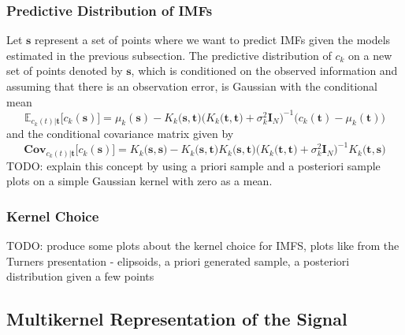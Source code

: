 \documentclass[article,moreauthors,pdftex,10pt,a4paper]{ssrn}
\begin{document}
\subsubsection{Predictive Distribution of IMFs}
Let $\mathbf{s}$ represent a set of points where we want to predict IMFs given the models estimated in the previous subsection.  The predictive distribution of $c_k$ on a new set of points denoted by $\mathbf{s}$, which is conditioned on the observed information and assuming that there is an observation error, is Gaussian with the conditional mean
\begin{equation*}
\mathbb{E}_{c_k(t)|\mathbf{t}} \big[c_k(\mathbf{s})] = \mu_k(\mathbf{s}) -  K_k \big(\mathbf{s},\mathbf{t}\big)\Big( K_k \big(\mathbf{t},\mathbf{t}\big) + \sigma^2_k \mathbf{I}_N \Big) ^{-1} \big( c_k(\mathbf{t}) - \mu_k(\mathbf{t})\big) 
\end{equation*}
and the conditional covariance matrix given by
\begin{equation*}
\mathbf{Cov}_{c_k(t)|\mathbf{t}} \big[c_k(\mathbf{s})] = K_k \big(\mathbf{s},\mathbf{s}\big) - K_k\big(\mathbf{s},\mathbf{t}\big) K_k \big(\mathbf{s},\mathbf{t}\big)\Big( K_k \big(\mathbf{t},\mathbf{t}\big) + \sigma^2_k \mathbf{I}_N \Big)^{-1} K_k \big(\mathbf{t},\mathbf{s}\big) 
\end{equation*}
TODO: explain this concept by using a priori sample and a posteriori sample plots on a simple Gaussian kernel with zero as a mean. 


\subsubsection{Kernel Choice}
TODO: produce some plots about the kernel choice for IMFS, plots like from the Turners presentation - elipsoids, a priori generated sample, a posteriori distribution given a few points

\subsection{Multikernel Representation of the Signal}
\end{document}
